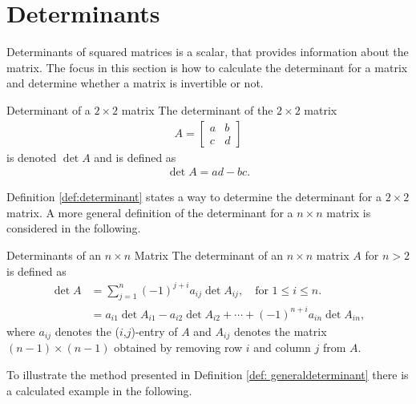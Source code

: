 \section{Determinants}
Determinants of squared matrices is a scalar, that provides information about the matrix. The focus in this section is how to calculate the determinant for a matrix and determine whether a matrix is invertible or not. 
\begin{definition}{Determinant of a $2\times 2$ matrix}
    The determinant of the $2\times 2$ matrix 
    \begin{align*}
        A=\begin{bmatrix}
           a & b\\ c & d
        \end{bmatrix}
    \end{align*}
   is denoted $\det A$ and is defined as 
    \begin{align*}
        \det A = ad-bc.
    \end{align*}
    \label{def:determinant}
\end{definition}
Definition \ref{def:determinant} states a way to determine the determinant for a $2\times 2$ matrix. A more general definition of the determinant for a $n\times n$ matrix is considered in the following.
\begin{definition}{Determinants of an $n\times n$ Matrix} 
    The determinant of an $n\times n$ matrix $A$ for $n>2$ is defined as
    \begin{align*}
    \det A &= \sum_{j=1}^n (-1)^{j+i}a_{ij}\det A_{ij}, \quad \text{for } 1 \leq i \leq n.\\
    &= a_{i1}\det A_{i1}-a_{i2}\det A_{i2}+\cdots+(-1)^{n+i}a_{in}\det A_{in},
    \end{align*}
    where $a_{ij}$ denotes the ($i$,$j$)-entry of $A$ and $A_{ij}$ denotes the matrix $(n-1)\times (n-1)$ obtained by removing row $i$ and column $j$ from $A$.
    \label{def: generaldeterminant}
\end{definition}
To illustrate the method presented in Definition \ref{def: generaldeterminant} there is a calculated example in the following.
